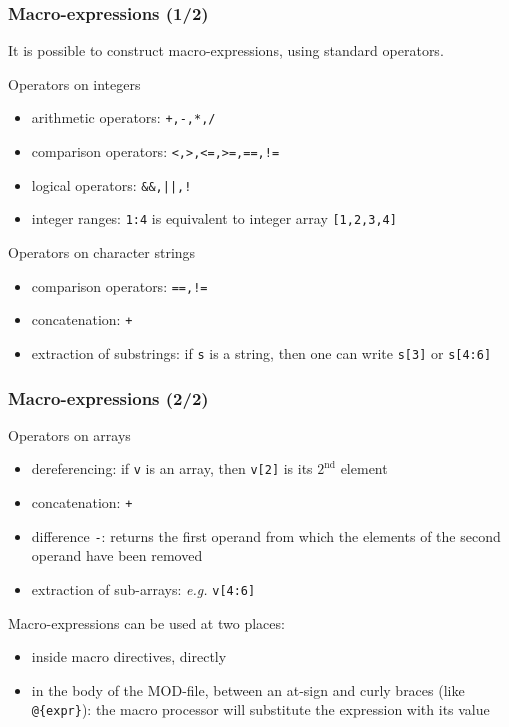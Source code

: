 \documentclass{beamer}
\begin{document}
\begin{frame}[fragile=singleslide]
  \frametitle{Macro-expressions (1/2)}
  It is possible to construct macro-expressions, using standard operators.
  \begin{block}{Operators on integers}
    \begin{itemize}
    \item arithmetic operators: \texttt{+,-,*,/}
    \item comparison operators: \texttt{<,>,<=,>=,==,!=}
    \item logical operators: \verb+&&,||,!+
    \item integer ranges: \texttt{1:4} is equivalent to integer array \texttt{[1,2,3,4]}
    \end{itemize}
  \end{block}

  \begin{block}{Operators on character strings}
    \begin{itemize}
    \item comparison operators: \texttt{==,!=}
    \item concatenation: \texttt{+}
    \item extraction of substrings: if \texttt{s} is a string, then one can write \texttt{s[3]} or \texttt{s[4:6]}
    \end{itemize}
  \end{block}
\end{frame}

\begin{frame}[fragile=singleslide]
  \frametitle{Macro-expressions (2/2)}
  \begin{block}{Operators on arrays}
    \begin{itemize}
    \item dereferencing: if \texttt{v} is an array, then \texttt{v[2]} is its $2^{\textrm{nd}}$ element
    \item concatenation: \texttt{+}
    \item difference \texttt{-}: returns the first operand from which the elements of the second operand have been removed
    \item extraction of sub-arrays: \textit{e.g.} \texttt{v[4:6]}
    \end{itemize}
  \end{block}

  Macro-expressions can be used at two places:
  \begin{itemize}
  \item inside macro directives, directly
  \item in the body of the MOD-file, between an at-sign and curly braces (like \verb+@{expr}+): the macro processor will substitute the expression with its value
  \end{itemize}
\end{frame}
\end{document}
